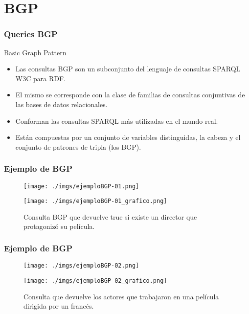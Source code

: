 \documentclass{beamer}
\begin{document}
\section{BGP}
\begin{frame}
\frametitle{Queries BGP}
\begin{exampleblock}{Basic Graph Pattern}
\begin{itemize}
\item<1-> Las consultas BGP son un subconjunto del lenguaje de consultas SPARQL W3C para RDF. 
\item<2-> El mismo se corresponde con la clase de familias de consultas conjuntivas de las bases de datos relacionales. 
\item<3-> Conforman las consultas SPARQL más utilizadas en el mundo real.
\item<4-> Están compuestas por un conjunto de variables distinguidas, la cabeza y el conjunto de patrones de tripla (los BGP).
\end{itemize}
\end{exampleblock}
\end{frame}

\begin{frame}
\frametitle{Ejemplo de BGP}
\begin{figure}[ht]
\centering
\begin{minipage}[b]{0.45\linewidth}
\texttt{[image: ./imgs/ejemploBGP-01.png]}
\label{fig:minipage1}
\end{minipage}
\quad
\begin{minipage}[b]{0.45\linewidth}
\texttt{[image: ./imgs/ejemploBGP-01\_grafico.png]}
\label{fig:minipage2}
\end{minipage}

Consulta BGP que devuelve true si existe un director que protagonizó su película.
\end{figure}
\end{frame}

\begin{frame}
\frametitle{Ejemplo de BGP}
\begin{figure}[ht]
\centering
\begin{minipage}[b]{0.45\linewidth}
\texttt{[image: ./imgs/ejemploBGP-02.png]}
\label{fig:minipage1}
\end{minipage}
\quad
\begin{minipage}[b]{0.45\linewidth}
\texttt{[image: ./imgs/ejemploBGP-02\_grafico.png]}
\label{fig:minipage2}
\end{minipage}

Consulta que devuelve los actores que trabajaron en una película dirigida por un francés.
\end{figure}
\end{frame}
\end{document}
